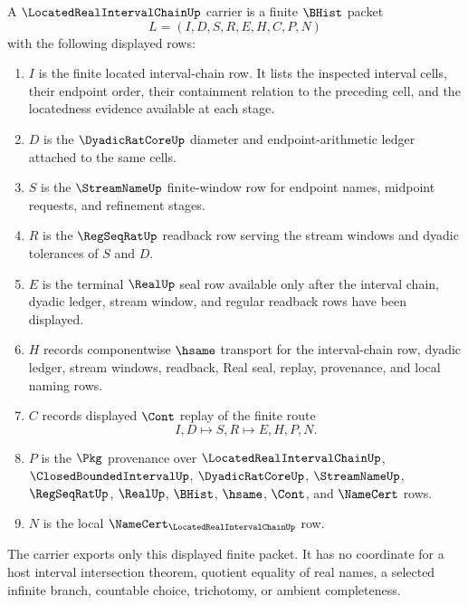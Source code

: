 \begin{definition}
\label{def:located-real-interval-chain-carrier}
A $\LocatedRealIntervalChainUp$ carrier is a finite $\BHist$ packet
$$
L=(I,D,S,R,E,H,C,P,N)
$$
with the following displayed rows:
\begin{enumerate}
\item $I$ is the finite located interval-chain row. It lists the inspected interval cells, their endpoint order, their containment relation to the preceding cell, and the locatedness evidence available at each stage.
\item $D$ is the $\DyadicRatCoreUp$ diameter and endpoint-arithmetic ledger attached to the same cells.
\item $S$ is the $\StreamNameUp$ finite-window row for endpoint names, midpoint requests, and refinement stages.
\item $R$ is the $\RegSeqRatUp$ readback row serving the stream windows and dyadic tolerances of $S$ and $D$.
\item $E$ is the terminal $\RealUp$ seal row available only after the interval chain, dyadic ledger, stream window, and regular readback rows have been displayed.
\item $H$ records componentwise $\hsame$ transport for the interval-chain row, dyadic ledger, stream windows, readback, Real seal, replay, provenance, and local naming rows.
\item $C$ records displayed $\Cont$ replay of the finite route
$$
I,D \longmapsto S,R \longmapsto E,H,P,N .
$$
\item $P$ is the $\Pkg$ provenance over $\LocatedRealIntervalChainUp$, $\ClosedBoundedIntervalUp$, $\DyadicRatCoreUp$, $\StreamNameUp$, $\RegSeqRatUp$, $\RealUp$, $\BHist$, $\hsame$, $\Cont$, and $\NameCert$ rows.
\item $N$ is the local $\NameCert_{\LocatedRealIntervalChainUp}$ row.
\end{enumerate}
The carrier exports only this displayed finite packet. It has no coordinate for a host interval intersection theorem, quotient equality of real names, a selected infinite branch, countable choice, trichotomy, or ambient completeness.
\end{definition}

